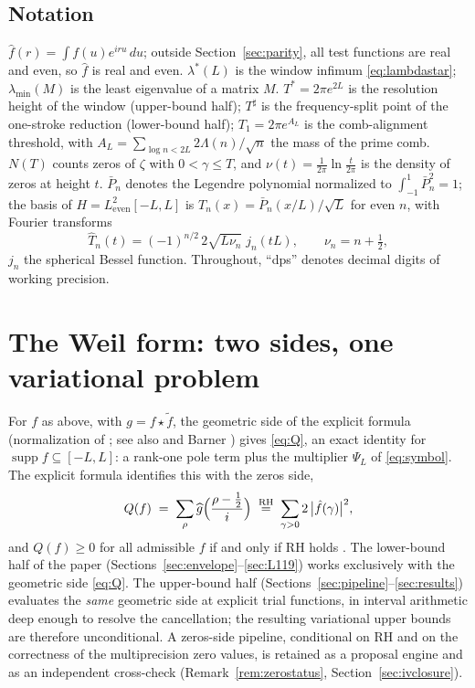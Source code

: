 ﻿\documentclass[11pt]{article}
\newcommand{\supp}{\operatorname{supp}}
\newcommand{\lmin}{\lambda^{*}}
\newcommand{\lammin}{\lambda_{\min}}
\newcommand{\Tstar}{T^{*}}
\newcommand{\Tsharp}{T^{\sharp}}
\newcommand{\fhat}{\hat f}
\begin{document}
\subsection{Notation}

$\fhat(r)=\int f(u)e^{iru}\,du$; outside Section~\ref{sec:parity}, all
test functions are real and even, so $\fhat$ is real and even.  $\lmin(L)$ is the window infimum
\eqref{eq:lambdastar}; $\lammin(M)$ is the least eigenvalue of a
matrix $M$.  $\Tstar=2\pi e^{2L}$ is the resolution height of the
window (upper-bound half); $\Tsharp$ is the frequency-split point of
the one-stroke reduction (lower-bound half); $T_1=2\pi e^{A_L}$ is
the comb-alignment threshold, with
$A_L=\sum_{\log n<2L}2\Lambda(n)/\sqrt n$ the mass of the prime comb.  $N(T)$ counts zeros of $\zeta$ with
$0<\gamma\le T$, and $\nu(t)=\frac1{2\pi}\ln\frac t{2\pi}$ is the
density of zeros at height $t$.  $\bar P_n$ denotes the Legendre
polynomial normalized to $\int_{-1}^1\bar P_n^2=1$; the basis of
$H=L^2_{\mathrm{even}}[-L,L]$ is $T_n(x)=\bar P_n(x/L)/\sqrt L$ for
even $n$, with Fourier transforms
\begin{equation}\label{eq:Tn}
\widehat T_n(t)=(-1)^{n/2}\,2\sqrt{L\nu_n}\;j_n(tL),
\qquad \nu_n=n+\tfrac12,
\end{equation}
$j_n$ the spherical Bessel function.  Throughout, ``dps'' denotes
decimal digits of working precision.

\section{The Weil form: two sides, one variational problem}
\label{sec:setup}

For $f$ as above, with $g=f\star\tilde f$, the geometric side of the
explicit formula (normalization of \cite{Bombieri2000}; see also
\cite[Ch.~5]{IK2004} and Barner \cite{Barner1981}) gives \eqref{eq:Q},
an exact identity for $\supp f\subseteq[-L,L]$: a rank-one pole term
plus the multiplier $\Psi_L$ of \eqref{eq:symbol}.  The explicit
formula identifies this with the zeros side,
\begin{equation}\label{eq:zerosside}
  Q(f)\;=\;\sum_{\rho}\widehat g\Bigl(\frac{\rho-\frac12}{i}\Bigr)
  \;\overset{\mathrm{RH}}{=}\;
  \sum_{\gamma>0} 2\,\bigl|\fhat(\gamma)\bigr|^{2},
\end{equation}
and $Q(f)\ge0$ for all admissible $f$ if and only if RH holds
\cite{Weil1952}.  The lower-bound half of the paper
(Sections~\ref{sec:envelope}--\ref{sec:L119}) works exclusively with
the geometric side \eqref{eq:Q}.  The upper-bound half
(Sections~\ref{sec:pipeline}--\ref{sec:results}) evaluates the
\emph{same} geometric side at explicit trial functions, in interval
arithmetic deep enough to resolve the cancellation; the resulting
variational upper bounds are therefore unconditional.  A zeros-side
pipeline, conditional on RH and on the correctness of the
multiprecision zero values, is retained as a proposal engine and as
an independent cross-check
(Remark~\ref{rem:zerostatus}, Section~\ref{sec:ivclosure}).
\end{document}
